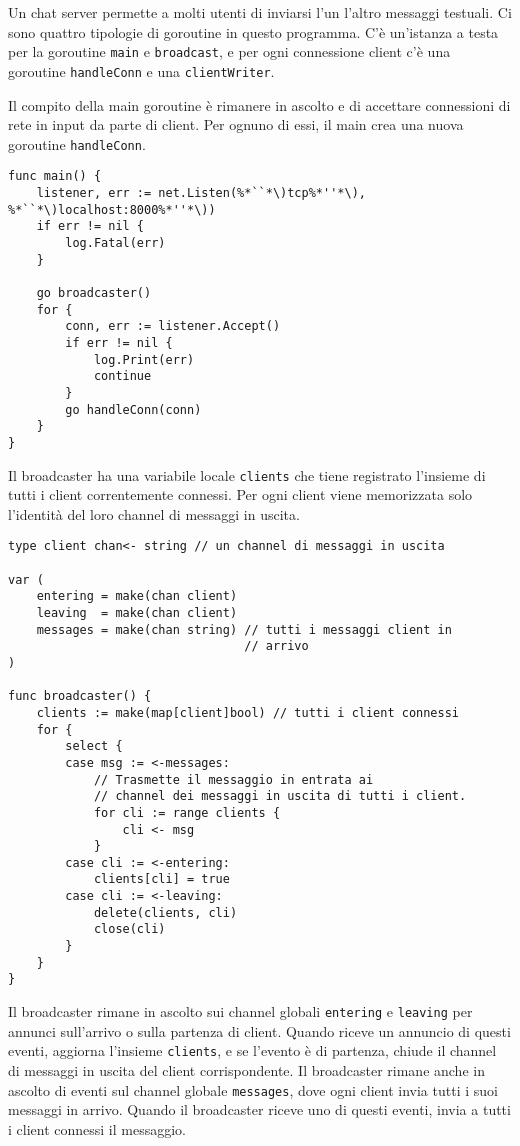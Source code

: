 %
Un chat server permette a molti utenti di inviarsi l'un l'altro messaggi testuali.
Ci sono quattro tipologie di goroutine in questo programma.
C'è un'istanza a testa per la goroutine \verb|main| e \verb|broadcast|, e per ogni connessione client c'è una goroutine \verb|handleConn| e una \verb|clientWriter|.

Il compito della main goroutine è rimanere in ascolto e di accettare connessioni di rete in input da parte di client.
Per ognuno di essi, il main crea una nuova goroutine \verb|handleConn|.
\begin{lstlisting}[frame=single, label={lst:lstlisting7-10.1}]
func main() {
    listener, err := net.Listen(%*``*\)tcp%*''*\), %*``*\)localhost:8000%*''*\))
    if err != nil {
        log.Fatal(err)
    }

    go broadcaster()
    for {
        conn, err := listener.Accept()
        if err != nil {
            log.Print(err)
            continue
        }
        go handleConn(conn)
    }
}
\end{lstlisting}
Il broadcaster ha una variabile locale \verb|clients| che tiene registrato l'insieme di tutti i client correntemente connessi.
Per ogni client viene memorizzata solo l'identità del loro channel di messaggi in uscita.
\begin{lstlisting}[frame=single, label={lst:lstlisting7-10.2}]
type client chan<- string // un channel di messaggi in uscita

var (
    entering = make(chan client)
    leaving  = make(chan client)
    messages = make(chan string) // tutti i messaggi client in
                                 // arrivo
)

func broadcaster() {
    clients := make(map[client]bool) // tutti i client connessi
    for {
        select {
        case msg := <-messages:
            // Trasmette il messaggio in entrata ai
            // channel dei messaggi in uscita di tutti i client.
            for cli := range clients {
                cli <- msg
            }
        case cli := <-entering:
            clients[cli] = true
        case cli := <-leaving:
            delete(clients, cli)
            close(cli)
        }
    }
}
\end{lstlisting}
Il broadcaster rimane in ascolto sui channel globali \verb|entering| e \verb|leaving| per annunci sull'arrivo o sulla partenza di client.
Quando riceve un annuncio di questi eventi, aggiorna l'insieme \verb|clients|, e se l'evento è di partenza, chiude il channel di messaggi in uscita del client corrispondente.
Il broadcaster rimane anche in ascolto di eventi sul channel globale \verb|messages|, dove ogni client invia tutti i suoi messaggi in arrivo.
Quando il broadcaster riceve uno di questi eventi, invia a tutti i client connessi il messaggio.


